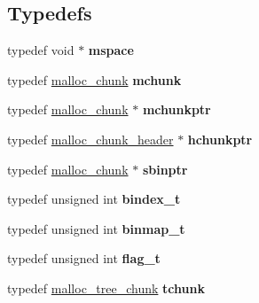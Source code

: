 \subsection*{Typedefs}
\begin{DoxyCompactItemize}
\item 
typedef void $\ast$ {\bfseries mspace}\hypertarget{namespacespp_a7715467de029aaf14f26d9ae3120cddf}{}\label{namespacespp_a7715467de029aaf14f26d9ae3120cddf}

\item 
typedef \hyperlink{structspp_1_1malloc__chunk}{malloc\+\_\+chunk} {\bfseries mchunk}\hypertarget{namespacespp_acb4eea3de9537d61baf5a8545640c392}{}\label{namespacespp_acb4eea3de9537d61baf5a8545640c392}

\item 
typedef \hyperlink{structspp_1_1malloc__chunk}{malloc\+\_\+chunk} $\ast$ {\bfseries mchunkptr}\hypertarget{namespacespp_ae3e43c0168c486b6d1886fbf2afbf2c4}{}\label{namespacespp_ae3e43c0168c486b6d1886fbf2afbf2c4}

\item 
typedef \hyperlink{structspp_1_1malloc__chunk__header}{malloc\+\_\+chunk\+\_\+header} $\ast$ {\bfseries hchunkptr}\hypertarget{namespacespp_ad36dfe43a56a6aa4741f1fd9bd670ada}{}\label{namespacespp_ad36dfe43a56a6aa4741f1fd9bd670ada}

\item 
typedef \hyperlink{structspp_1_1malloc__chunk}{malloc\+\_\+chunk} $\ast$ {\bfseries sbinptr}\hypertarget{namespacespp_a6307a9044bcf3119906db13b981805d7}{}\label{namespacespp_a6307a9044bcf3119906db13b981805d7}

\item 
typedef unsigned int {\bfseries bindex\+\_\+t}\hypertarget{namespacespp_a9a424b380e08f314fb88d776e29561da}{}\label{namespacespp_a9a424b380e08f314fb88d776e29561da}

\item 
typedef unsigned int {\bfseries binmap\+\_\+t}\hypertarget{namespacespp_a501360f2e76ed50a9f9d2ae01f28d489}{}\label{namespacespp_a501360f2e76ed50a9f9d2ae01f28d489}

\item 
typedef unsigned int {\bfseries flag\+\_\+t}\hypertarget{namespacespp_ae45bb94b019a6a2fe5a8df91ca54ca76}{}\label{namespacespp_ae45bb94b019a6a2fe5a8df91ca54ca76}

\item 
typedef \hyperlink{structspp_1_1malloc__tree__chunk}{malloc\+\_\+tree\+\_\+chunk} {\bfseries tchunk}\hypertarget{namespacespp_aaf2c3aa4e19277258f801c8267a56f0f}{}\label{namespacespp_aaf2c3aa4e19277258f801c8267a56f0f}


\end{DoxyCompactItemize}
